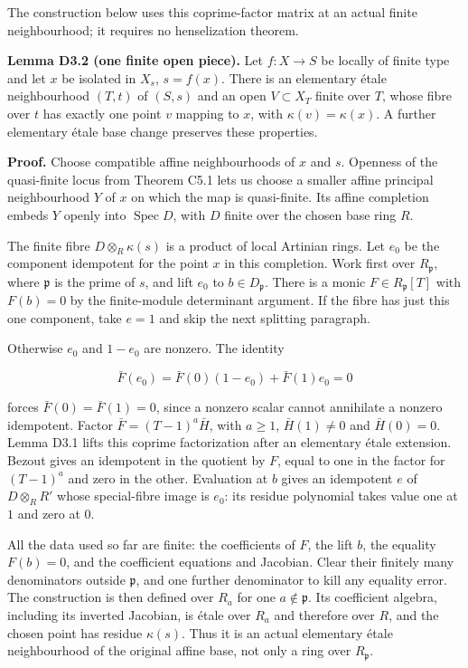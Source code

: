 \documentclass[11pt,a4paper,openany]{report}
\begin{document}
The construction below uses this coprime-factor matrix at an actual finite neighbourhood; it requires no henselization theorem.

\textbf{Lemma D3.2 (one finite open piece).} Let \(f:X\to S\) be locally of finite type and let \(x\) be isolated in \(X_s\), \(s=f(x)\). There is an elementary étale neighbourhood \((T,t)\) of \((S,s)\) and an open \(V\subset X_T\) finite over \(T\), whose fibre over \(t\) has exactly one point \(v\) mapping to \(x\), with \(\kappa(v)=\kappa(x)\). A further elementary étale base change preserves these properties.

\textbf{Proof.} Choose compatible affine neighbourhoods of \(x\) and \(s\). Openness of the quasi-finite locus from Theorem C5.1 lets us choose a smaller affine principal neighbourhood \(Y\) of \(x\) on which the map is quasi-finite. Its affine completion embeds \(Y\) openly into \(\operatorname{Spec}D\), with \(D\) finite over the chosen base ring \(R\).

The finite fibre \(D\otimes_R\kappa(s)\) is a product of local Artinian rings. Let \(e_0\) be the component idempotent for the point \(x\) in this completion. Work first over \(R_{\mathfrak p}\), where \(\mathfrak p\) is the prime of \(s\), and lift \(e_0\) to \(b\in D_{\mathfrak p}\). There is a monic \(F\in R_{\mathfrak p}[T]\) with \(F(b)=0\) by the finite-module determinant argument. If the fibre has just this one component, take \(e=1\) and skip the next splitting paragraph.

Otherwise \(e_0\) and \(1-e_0\) are nonzero. The identity

\[
\bar F(e_0)=\bar F(0)(1-e_0)+\bar F(1)e_0=0
\]

forces \(\bar F(0)=\bar F(1)=0\), since a nonzero scalar cannot annihilate a nonzero idempotent. Factor \(\bar F=(T-1)^a\bar H\), with \(a\ge1\), \(\bar H(1)\ne0\) and \(\bar H(0)=0\). Lemma D3.1 lifts this coprime factorization after an elementary étale extension. Bezout gives an idempotent in the quotient by \(F\), equal to one in the factor for \((T-1)^a\) and zero in the other. Evaluation at \(b\) gives an idempotent \(e\) of \(D\otimes_RR'\) whose special-fibre image is \(e_0\): its residue polynomial takes value one at \(1\) and zero at \(0\).

All the data used so far are finite: the coefficients of \(F\), the lift \(b\), the equality \(F(b)=0\), and the coefficient equations and Jacobian. Clear their finitely many denominators outside \(\mathfrak p\), and one further denominator to kill any equality error. The construction is then defined over \(R_a\) for one \(a\notin\mathfrak p\). Its coefficient algebra, including its inverted Jacobian, is étale over \(R_a\) and therefore over \(R\), and the chosen point has residue \(\kappa(s)\). Thus it is an actual elementary étale neighbourhood of the original affine base, not only a ring over \(R_{\mathfrak p}\).
\end{document}

